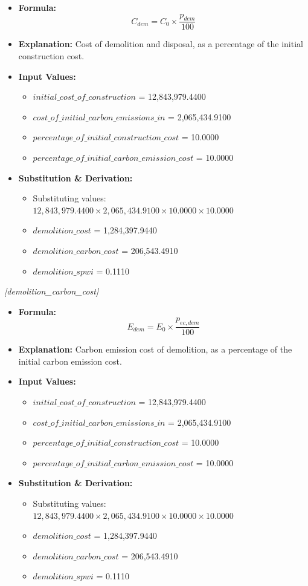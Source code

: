 \documentclass[12pt,a4paper]{article}
\begin{document}
\begin{itemize}
  \item \textbf{Formula:} $$C_{dem} = C_0 \times \frac{p_{dem}}{100}$$
  \item \textbf{Explanation:} Cost of demolition and disposal, as a percentage of the initial construction cost.
  \item \textbf{Input Values:}
  \begin{itemize}
    \item $initial\_cost\_of\_construction$ = 12,843,979.4400
    \item $cost\_of\_initial\_carbon\_emissions\_in$ = 2,065,434.9100
    \item $percentage\_of\_initial\_construction\_cost$ = 10.0000
    \item $percentage\_of\_initial\_carbon\_emission\_cost$ = 10.0000
  \end{itemize}
  \item \textbf{Substitution \& Derivation:}
  \begin{itemize}
    \item Substituting values: $12,843,979.4400 \times 2,065,434.9100 \times 10.0000 \times 10.0000$
    \item $demolition\_cost$ = 1,284,397.9440
    \item $demolition\_carbon\_cost$ = 206,543.4910
    \item $demolition\_spwi$ = 0.1110
  \end{itemize}
\end{itemize}


\textit{[demolition\_carbon\_cost]}

\begin{itemize}
  \item \textbf{Formula:} $$E_{dem} = E_0 \times \frac{p_{ec,dem}}{100}$$
  \item \textbf{Explanation:} Carbon emission cost of demolition, as a percentage of the initial carbon emission cost.
  \item \textbf{Input Values:}
  \begin{itemize}
    \item $initial\_cost\_of\_construction$ = 12,843,979.4400
    \item $cost\_of\_initial\_carbon\_emissions\_in$ = 2,065,434.9100
    \item $percentage\_of\_initial\_construction\_cost$ = 10.0000
    \item $percentage\_of\_initial\_carbon\_emission\_cost$ = 10.0000
  \end{itemize}
  \item \textbf{Substitution \& Derivation:}
  \begin{itemize}
    \item Substituting values: $12,843,979.4400 \times 2,065,434.9100 \times 10.0000 \times 10.0000$
    \item $demolition\_cost$ = 1,284,397.9440
    \item $demolition\_carbon\_cost$ = 206,543.4910
    \item $demolition\_spwi$ = 0.1110
  \end{itemize}
\end{itemize}
\end{document}
